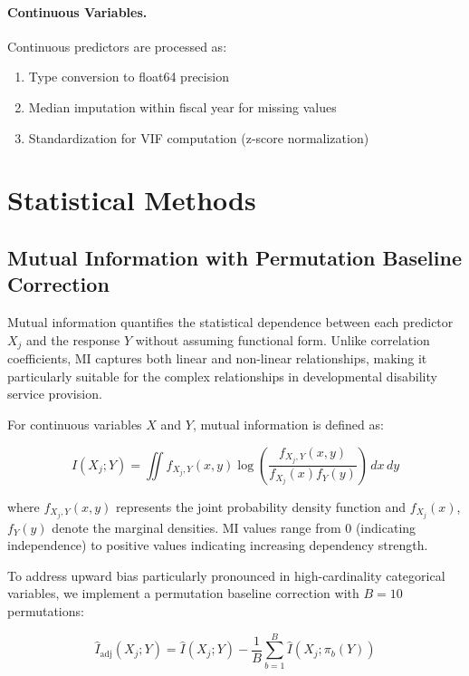 \paragraph{Continuous Variables.}
Continuous predictors are processed as:
\begin{enumerate}
    \item Type conversion to float64 precision
    \item Median imputation within fiscal year for missing values
    \item Standardization for VIF computation (z-score normalization)
\end{enumerate}

\section{Statistical Methods}

\subsection{Mutual Information with Permutation Baseline Correction}

Mutual information quantifies the statistical dependence between each predictor $X_j$ and the response $Y$ without assuming functional form. Unlike correlation coefficients, MI captures both linear and non-linear relationships, making it particularly suitable for the complex relationships in developmental disability service provision.

For continuous variables $X$ and $Y$, mutual information is defined as:

\begin{equation}
I(X_j; Y) = \iint f_{X_j,Y}(x,y) \log\left(\frac{f_{X_j,Y}(x,y)}{f_{X_j}(x)f_Y(y)}\right) \, dx \, dy
\label{eq:mi-definition}
\end{equation}

where $f_{X_j,Y}(x,y)$ represents the joint probability density function and $f_{X_j}(x)$, $f_Y(y)$ denote the marginal densities. MI values range from 0 (indicating independence) to positive values indicating increasing dependency strength.

To address upward bias particularly pronounced in high-cardinality categorical variables, we implement a permutation baseline correction with $B = 10$ permutations:

\begin{equation}
\widehat{I}_{\text{adj}}(X_j; Y) = \widehat{I}(X_j; Y) - \frac{1}{B}\sum_{b=1}^{B} \widehat{I}(X_j; \pi_b(Y))
\label{eq:mi-adjusted}
\end{equation}

